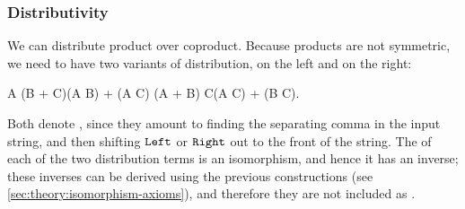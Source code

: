 \subsubsection{Distributivity}
\label{sec:atomic-for-distributivity}
    We can distribute product over coproduct.  Because products are not symmetric, we need to have two variants of distribution, on the left and on the right: 
    \begin{atomicterm}
        \label{atomic:distributivity}
\describeterm{\distrterm} {A \times (B + C)}{(A \times B) + (A \times C)} \qquad 
\describeterm{\distlterm} {(A + B) \times C}{(A \times C) + (B \times C)}.
    \end{atomicterm}
    Both  denote , since they  amount to finding the separating comma in the input string, and then shifting $\mathtt{Left}$ or $\mathtt{Right}$ out to the front of the string.  The  of each of the two distribution terms is an isomorphism, and hence it has an inverse; these inverses can be derived using the previous constructions (see \cref{sec:theory:isomorphism-axioms}), and therefore they are not included as .

